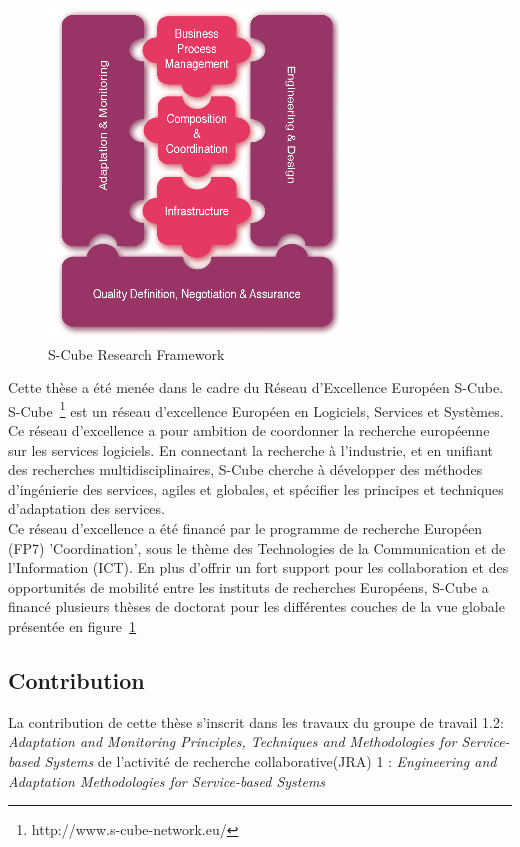 \begin{figure}
  \vspace{-1.5cm}
  \centering
  \includegraphics[width=.3\textwidth]{part1/pics/scube-overview.png}
  \caption{S-Cube Research Framework}
  \label{fig:scube-overview}
 \vspace{-0.4cm}  
\end{figure}
Cette thèse a été menée dans le cadre du Réseau d'Excellence Européen S-Cube.
S-Cube~\footnote{http://www.s-cube-network.eu/} est un réseau d'excellence Européen en Logiciels, Services et Systèmes. Ce réseau d'excellence a pour ambition de coordonner la recherche européenne sur les services logiciels. En connectant la recherche à l'industrie, et en unifiant des recherches multidisciplinaires, S-Cube cherche à développer des méthodes d'ingénierie des services, agiles et globales, et spécifier les principes et techniques d'adaptation des services.\\
Ce réseau d'excellence a été financé par le programme de recherche Européen (FP7) 'Coordination', sous le thème des Technologies de la Communication et de l'Information (ICT). En plus d'offrir un fort support pour les collaboration et des opportunités de mobilité entre les instituts de recherches Européens, S-Cube a financé plusieurs thèses de doctorat pour les différentes couches de la vue globale présentée en figure~\ref{fig:scube-overview}\\



\subsection{Contribution}


La contribution de cette thèse s'inscrit dans les travaux du groupe de travail 1.2: {\it Adaptation and Monitoring Principles, Techniques and Methodologies for Service-based Systems} de l'activité de recherche collaborative(JRA) 1 : {\it Engineering and Adaptation Methodologies for Service-based Systems}\\

